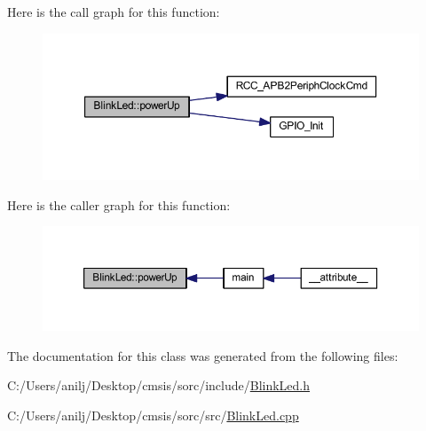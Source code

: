 Here is the call graph for this function\+:
\nopagebreak
\begin{figure}[H]
\begin{center}
\leavevmode
\includegraphics[width=350pt]{class_blink_led_a38fcbc34c6ff8a1083b64bbbb309a54c_cgraph}
\end{center}
\end{figure}
Here is the caller graph for this function\+:
\nopagebreak
\begin{figure}[H]
\begin{center}
\leavevmode
\includegraphics[width=350pt]{class_blink_led_a38fcbc34c6ff8a1083b64bbbb309a54c_icgraph}
\end{center}
\end{figure}


The documentation for this class was generated from the following files\+:\begin{DoxyCompactItemize}
\item 
C\+:/\+Users/anilj/\+Desktop/cmsis/sorc/include/\hyperlink{_blink_led_8h}{Blink\+Led.\+h}\item 
C\+:/\+Users/anilj/\+Desktop/cmsis/sorc/src/\hyperlink{_blink_led_8cpp}{Blink\+Led.\+cpp}\end{DoxyCompactItemize}
